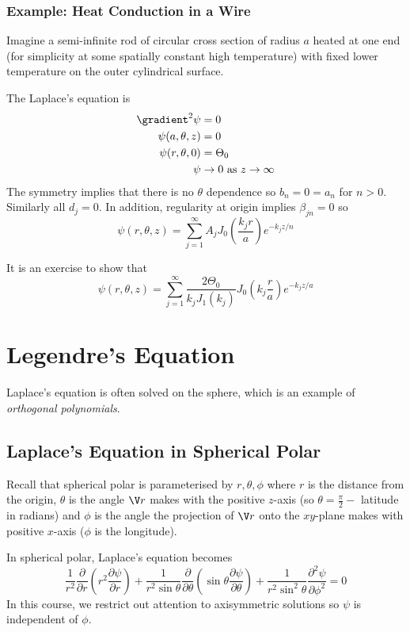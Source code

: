 \documentclass[a4paper]{article}
\newcommand*{\grad}{\gradient}
\newcommand*{\laplace}{\grad^2}
\newcommand*{\lap}{\laplace}
\begin{document}
\subsubsection{Example: Heat Conduction in a Wire}

Imagine a semi-infinite rod of circular cross section of radius \(a\) heated at one end (for simplicity at some spatially constant high temperature) with fixed lower temperature on the outer cylindrical surface.

The Laplace's equation is
\begin{align*}
  \lap \psi &= 0 \\
  \psi(a, \theta, z) &= 0 \\
  \psi(r, \theta, 0) &= \Theta_0 \\
  \psi &\to 0 \text{ as } z \to \infty
\end{align*}
The symmetry implies that there is no \(\theta\) dependence so \(b_n = 0 = a_n\) for \(n > 0\). Similarly all \(d_j = 0\). In addition, regularity at origin implies \(\beta_{jn} = 0\) so
\[
  \psi(r, \theta, z) = \sum_{j = 1}^{\infty} A_j J_0 \left( \frac{k_j r}{a} \right) e^{-k_jz/n}
\]

It is an exercise to show that
\[
  \psi(r, \theta, z) = \sum_{j = 1}^{\infty} \frac{2 \Theta_0}{k_j J_1(k_j)} J_0 \left( k_j \frac{r}{a} \right) e^{-k_j z/a}
\]

\section{Legendre's Equation}

Laplace's equation is often solved on the sphere, which is an example of \emph{orthogonal polynomials}.

\subsection{Laplace's Equation in Spherical Polar}

Recall that spherical polar is parameterised by \(r, \theta, \phi\) where \(r\) is the distance from the origin, \(\theta\) is the angle \(\V r\) makes with the positive \(z\)-axis (so \(\theta = \frac{\pi}{2} -\) latitude in radians) and \(\phi\) is the angle the projection of \(\V r\) onto the \(xy\)-plane makes with positive \(x\)-axis (\(\phi\) is the longitude).

In spherical polar, Laplace's equation becomes
\[
  \frac{1}{r^2} \frac{\partial  }{\partial r} \left( r^2 \frac{\partial \psi}{\partial r} \right) + \frac{1}{r^2 \sin \theta} \frac{\partial  }{\partial \theta} \left( \sin \theta \frac{\partial \psi}{\partial \theta} \right) + \frac{1}{r^2\sin^2 \theta} \frac{\partial^2 \psi}{\partial \phi^2} = 0
\]
In this course, we restrict out attention to axisymmetric solutions so \(\psi\) is independent of \(\phi\).
\end{document}
